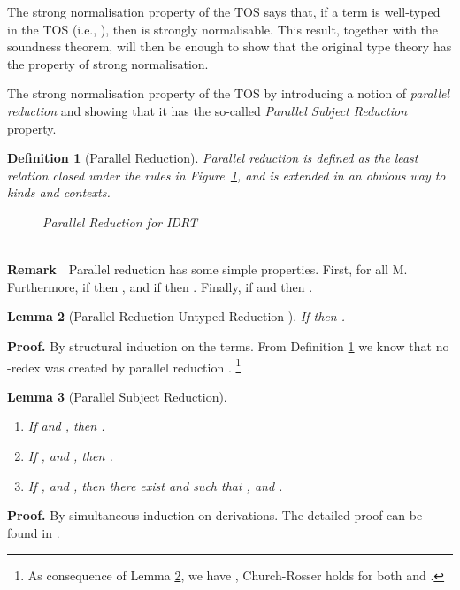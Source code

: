 \documentclass[submission,copyright,creativecommons]{eptcs}
\newcommand{\selfcomment}[1]{\ifodd 0 {\sf #1 }\fi}
\newcommand{\selfc}{\selfcomment}
\newtheorem{definition}{Definition}[section]
\newtheorem{lemma}[definition]{Lemma}
\newcommand{\remark}{\ \\{\bf Remark}\ }
\newcommand{\qed}{}
\newcommand{\ie}{{i.e.}}
\begin{document}
The strong normalisation property of the TOS says that, if a term  is well-typed in the TOS (\ie, ), then  is strongly normalisable.  This result, together with the soundness theorem, will then be enough to show that the original type theory has the property of strong normalisation.

The strong normalisation property of the TOS by introducing a notion of \emph{parallel reduction} and showing that it has the so-called \emph{Parallel Subject Reduction} property.

\begin{definition}[Parallel Reduction] \label{Pal-Red}
Parallel reduction  is defined as the least relation closed under the rules in Figure~\ref{Parallel-reduction}, and is extended in an obvious way to kinds and contexts.

\begin{figure}[here]
\framebox[5.8in][c]{
\begin{minipage}{\linewidth}
\ \\







\\
\end{minipage}
}\caption{Parallel Reduction for IDRT} \label{Parallel-reduction}
\end{figure}
\end{definition}

\remark\ Parallel reduction has some simple properties. First,  for all M. Furthermore, if  then , and if  then . Finally, if  and  then .

\selfc{
\begin{lemma}[Parallel Reduction   Untyped Reduction ] \label{rel-reductions}
If  then . \end{lemma}
\textbf{Proof.} By structural induction on the terms. From Definition \ref{Parallel-reduction} we know that no -redex was created by parallel reduction . \footnote{As consequence of Lemma \ref{rel-reductions}, we have , Church-Rosser holds for both  and . } \qed \\
}

\begin{lemma}[Parallel Subject Reduction] \label{PSR}\
\begin{enumerate}
  \item If  and , then .
  \item If ,  and , then .
  \item If ,  and , then there exist  and  such that ,  and .
\end{enumerate}
\end{lemma}
\textbf{Proof.} By simultaneous induction on derivations. The detailed proof can be found in \cite{Fen10}.
\end{document}
